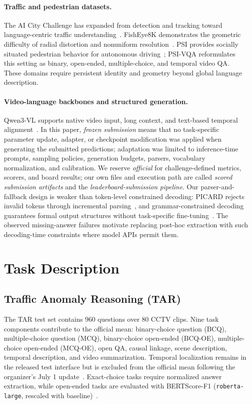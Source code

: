 \documentclass[runningheads]{llncs}
\begin{document}
\paragraph{Traffic and pedestrian datasets.}
The AI City Challenge has expanded from detection and tracking toward language-centric traffic understanding~\cite{aicity2024,tang2026aicity}. FishEye8K demonstrates the geometric difficulty of radial distortion and nonuniform resolution~\cite{fisheye8k}. PSI provides socially situated pedestrian behavior for autonomous driving~\cite{psi}; PSI-VQA reformulates this setting as binary, open-ended, multiple-choice, and temporal video QA. These domains require persistent identity and geometry beyond global language description.

\paragraph{Video-language backbones and structured generation.}
Qwen3-VL supports native video input, long context, and text-based temporal alignment~\cite{qwen3vl}. In this paper, \emph{frozen submission} means that no task-specific parameter update, adapter, or checkpoint modification was applied when generating the submitted predictions; adaptation was limited to inference-time prompts, sampling policies, generation budgets, parsers, vocabulary normalization, and calibration. We reserve \emph{official} for challenge-defined metrics, scorers, and board results; our own files and execution path are called \emph{scored submission artifacts} and the \emph{leaderboard-submission pipeline}. Our parser-and-fallback design is weaker than token-level constrained decoding: PICARD rejects invalid tokens through incremental parsing~\cite{picard}, and grammar-constrained decoding guarantees formal output structures without task-specific fine-tuning~\cite{gcd}. The observed missing-answer failures motivate replacing post-hoc extraction with such decoding-time constraints where model APIs permit them.

\section{Task Description}
\subsection{Traffic Anomaly Reasoning (TAR)}
The TAR test set contains 960 questions over 80 CCTV clips. Nine task components contribute to the official mean: binary-choice question (BCQ), multiple-choice question (MCQ), binary-choice open-ended (BCQ-OE), multiple-choice open-ended (MCQ-OE), open QA, causal linkage, scene description, temporal description, and video summarization. Temporal localization remains in the released test interface but is excluded from the official mean following the organizer's July 1 update~\cite{aicity2026track3}. Exact-choice tasks require normalized answer extraction, while open-ended tasks are evaluated with BERTScore-F1 (\texttt{roberta-large}, rescaled with baseline)~\cite{bertscore}.
\end{document}
